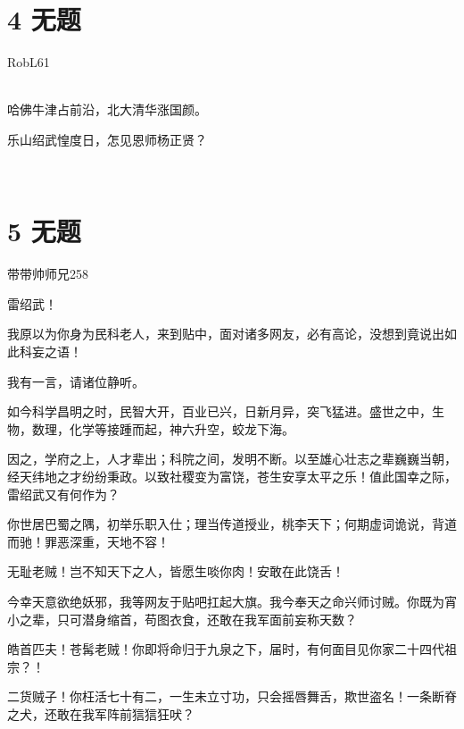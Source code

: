 \documentclass[UTF8,12pt,oneside]{ctexbook}
\begin{document}
    \section{4 无题}
    \begin{center}
        RobL61
        
        ~\\
        哈佛牛津占前沿，北大清华涨国颜。
        
        乐山绍武惶度日，怎见恩师杨正贤？
        
        ~\\

    \end{center}
    
    \newpage
    
    \section{5 无题}
        \begin{center}
            带带帅师兄258
            
        \end{center}
        
        雷绍武！
        
        我原以为你身为民科老人，来到贴中，面对诸多网友，必有高论，没想到竟说出如此科妄之语！
        
        我有一言，请诸位静听。
        
        如今科学昌明之时，民智大开，百业已兴，日新月异，突飞猛进。盛世之中，生物，数理，化学等接踵而起，神六升空，蛟龙下海。
        
        因之，学府之上，人才辈出；科院之间，发明不断。以至雄心壮志之辈巍巍当朝，经天纬地之才纷纷秉政。以致社稷变为富饶，苍生安享太平之乐！值此国幸之际，雷绍武又有何作为？
        
        你世居巴蜀之隅，初举乐职入仕；理当传道授业，桃李天下；何期虚词诡说，背道而驰！罪恶深重，天地不容！
        
        无耻老贼！岂不知天下之人，皆愿生啖你肉！安敢在此饶舌！
        
        今幸天意欲绝妖邪，我等网友于贴吧扛起大旗。我今奉天之命兴师讨贼。你既为宵小之辈，只可潜身缩首，苟图衣食，还敢在我军面前妄称天数？
        
        皓首匹夫！苍髯老贼！你即将命归于九泉之下，届时，有何面目见你家二十四代祖宗？！
        
        二货贼子！你枉活七十有二，一生未立寸功，只会摇唇舞舌，欺世盗名！一条断脊之犬，还敢在我军阵前狺狺狂吠？
        
\end{document}

